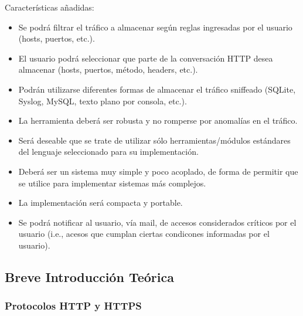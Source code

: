 Características añadidas:
\begin{itemize}
	\item Se podrá filtrar el tráfico a almacenar según reglas ingresadas por el usuario (hosts, puertos, etc.).
	\item El usuario podrá seleccionar que parte de la conversación HTTP desea almacenar (hosts, puertos, método, headers, etc.).
	\item Podrán utilizarse diferentes formas de almacenar el tráfico sniffeado (SQLite, Syslog, MySQL, texto plano por consola, etc.).
	\item La herramienta deberá ser robusta y no romperse por anomalías en el tráfico.
	\item Será deseable que se trate de utilizar sólo herramientas/módulos estándares del lenguaje seleccionado para su implementación.
	\item Deberá ser un sistema muy simple y poco acoplado, de forma de permitir que se utilice para implementar sistemas más complejos.
	\item La implementación será compacta y portable.
	\item Se podrá notificar al usuario, vía mail, de accesos considerados críticos por el usuario (i.e., acesos que cumplan ciertas condicones informadas por el usuario).
\end{itemize}


\subsection{Breve Introducción Teórica}

\subsubsection{Protocolos HTTP y HTTPS}

